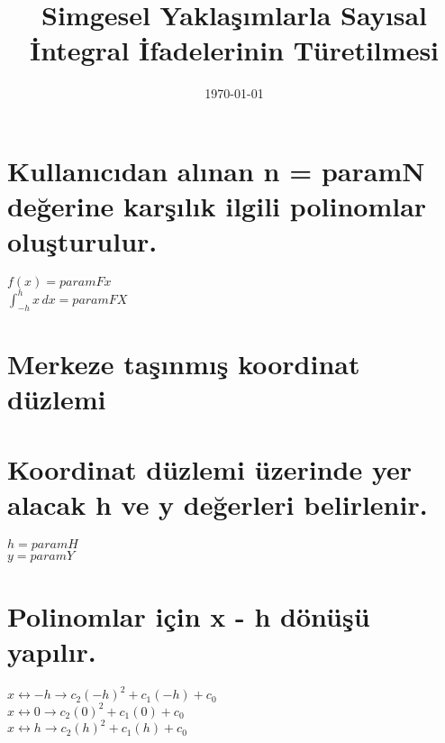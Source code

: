 \documentclass{article}
\begin{document}
\title{Simgesel Yaklaşımlarla Sayısal İntegral İfadelerinin Türetilmesi}
\date{\today}
\maketitle

\section{Kullanıcıdan alınan n = paramN değerine karşılık ilgili polinomlar oluşturulur.}
\begin{center}
$f(x) = paramFx$\\
$\int_{-h}^{h}x\,dx = paramFX$
\end{center}

\section{Merkeze taşınmış koordinat düzlemi}
\begin{center}
\end{center}

\section{Koordinat düzlemi üzerinde yer alacak h ve y değerleri belirlenir.}
$h = paramH$\\
$y = paramY$

\section{Polinomlar için x - h dönüşü yapılır.}
$x \leftrightarrow -h \longrightarrow c_{2}(-h)^2 + c_{1}(-h) + c_{0} $\\
$x \leftrightarrow 0 \longrightarrow c_{2}(0)^2 + c_{1}(0) + c_{0}$\\
$x \leftrightarrow h \longrightarrow c_{2}(h)^2 + c_{1}(h) + c_{0}$
\end{document}
